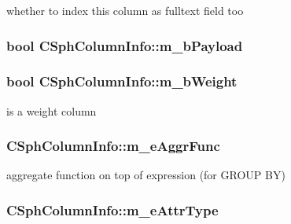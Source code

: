 whether to index this column as fulltext field too 

\hypertarget{structCSphColumnInfo_a2052963e97837238106e08824f7d52fd}{
\subsubsection[{m\-\_\-b\-Payload}]{\setlength{\rightskip}{0pt plus 5cm}bool C\-Sph\-Column\-Info\-::m\-\_\-b\-Payload}}\label{structCSphColumnInfo_a2052963e97837238106e08824f7d52fd}
\hypertarget{structCSphColumnInfo_a247e4a846b54372c1dd6e30a8dc73bbe}{
\subsubsection[{m\-\_\-b\-Weight}]{\setlength{\rightskip}{0pt plus 5cm}bool C\-Sph\-Column\-Info\-::m\-\_\-b\-Weight}}\label{structCSphColumnInfo_a247e4a846b54372c1dd6e30a8dc73bbe}


is a weight column 

\hypertarget{structCSphColumnInfo_a5426129bbf0e925048f14f741fec79e4}{
\subsubsection[{m\-\_\-e\-Aggr\-Func}]{ C\-Sph\-Column\-Info\-::m\-\_\-e\-Aggr\-Func}}\label{structCSphColumnInfo_a5426129bbf0e925048f14f741fec79e4}


aggregate function on top of expression (for G\-R\-O\-U\-P B\-Y) 

\hypertarget{structCSphColumnInfo_af245356e2540a4cd90aaf095045a477c}{
\subsubsection[{m\-\_\-e\-Attr\-Type}]{ C\-Sph\-Column\-Info\-::m\-\_\-e\-Attr\-Type}}\label{structCSphColumnInfo_af245356e2540a4cd90aaf095045a477c}


